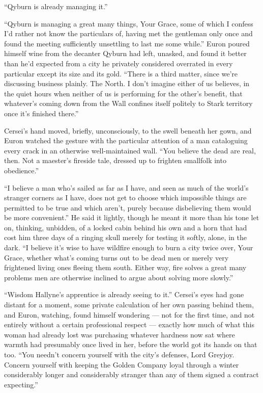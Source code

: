 “Qyburn is already managing it.”

“Qyburn is managing a great many things, Your Grace, some of which I confess I’d rather not know the particulars of, having met the gentleman only once and found the meeting sufficiently unsettling to last me some while.” Euron poured himself wine from the decanter Qyburn had left, unasked, and found it better than he’d expected from a city he privately considered overrated in every particular except its size and its gold. “There is a third matter, since we’re discussing business plainly. The North. I don’t imagine either of us believes, in the quiet hours when neither of us is performing for the other’s benefit, that whatever’s coming down from the Wall confines itself politely to Stark territory once it’s finished there.”

Cersei’s hand moved, briefly, unconsciously, to the swell beneath her gown, and Euron watched the gesture with the particular attention of a man cataloguing every crack in an otherwise well-maintained wall. “You believe the dead are real, then. Not a maester’s fireside tale, dressed up to frighten smallfolk into obedience.”

“I believe a man who’s sailed as far as I have, and seen as much of the world’s stranger corners as I have, does not get to choose which impossible things are permitted to be true and which aren’t, purely because disbelieving them would be more convenient.” He said it lightly, though he meant it more than his tone let on, thinking, unbidden, of a locked cabin behind his own and a horn that had cost him three days of a ringing skull merely for testing it softly, alone, in the dark. “I believe it’s wise to have wildfire enough to burn a city twice over, Your Grace, whether what’s coming turns out to be dead men or merely very frightened living ones fleeing them south. Either way, fire solves a great many problems men are otherwise inclined to argue about solving more slowly.”

“Wisdom Hallyne’s apprentice is already seeing to it.” Cersei’s eyes had gone distant for a moment, some private calculation of her own passing behind them, and Euron, watching, found himself wondering — not for the first time, and not entirely without a certain professional respect — exactly how much of what this woman had already lost was purchasing whatever hardness now sat where warmth had presumably once lived in her, before the world got its hands on that too. “You needn’t concern yourself with the city’s defenses, Lord Greyjoy. Concern yourself with keeping the Golden Company loyal through a winter considerably longer and considerably stranger than any of them signed a contract expecting.”

